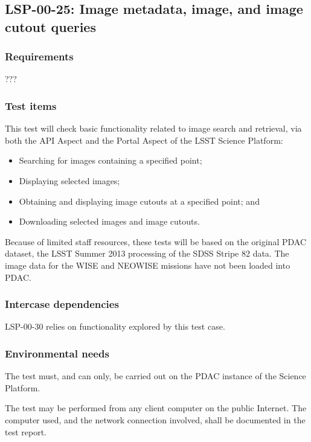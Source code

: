 \subsection{LSP-00-25: Image metadata, image, and image cutout queries}
\label{lsp-00-25}

\subsubsection{Requirements}

???

\subsubsection{Test items}

This test will check basic functionality related to image search and retrieval, via both the API Aspect and the Portal Aspect of the LSST Science Platform:

\begin{itemize}

  \item{Searching for images containing a specified point;}
  \item{Displaying selected images;}
  \item{Obtaining and displaying image cutouts at a specified point; and}
  \item{Downloading selected images and image cutouts.}

\end{itemize}

Because of limited staff resources, these tests will be based on the original PDAC dataset, the LSST Summer 2013 processing of the SDSS Stripe 82 data.
The image data for the WISE and NEOWISE missions have not been loaded into PDAC.

\subsubsection{Intercase dependencies}

LSP-00-30 relies on functionality explored by this test case.

\subsubsection{Environmental needs}

The test must, and can only, be carried out on the PDAC instance of the Science Platform.

The test may be performed from any client computer on the public Internet.
The computer used, and the network connection involved, shall be documented in the test report.

